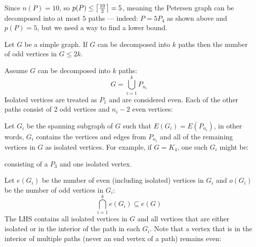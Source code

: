 \documentclass[letterpaper,12pt,fleqn]{article}
\DeclarePairedDelimiter{\ceil}{\lceil}{\rceil}
\begin{document}
\begin{example}
  Since $n(P)=10$, so $p(P)\le\ceil*{\frac{10}{2}}=5$, meaning the Petersen
  graph can be decomposed into at most $5$ paths --- indeed: $P=5P_4$ as shown
  above and $p(P)=5$, but we need a way to find a lower bound.
\end{example}

\begin{theorem}
  Let $G$ be a simple graph. If $G$ can be decomposed into $k$ paths then the
  number of odd vertices in $G\le2k$.
\end{theorem}

\begin{theproof}
  Assume $G$ can be decomposed into $k$ paths:
  \[G=\bigcup_{i=1}^kP_{n_i}\]
  Isolated vertices are treated as $P_1$ and are considered even. Each of the
  other paths consist of $2$ odd vertices and $n_i-2$ even vertices:


  Let $G_i$ be the spanning subgraph of $G$ such that $E(G_i)=E(P_{n_i})$, in
  other words, $G_i$ contains the vertices and edges from $P_{n_i}$ and all of
  the remaining vertices in $G$ as isolated vertices. For example, if $G=K_4$,
  one such $G_i$ might be:


  consisting of a $P_3$ and one isolated vertex.

  Let $e(G_i)$ be the number of even (including isolated) vertices in $G_i$ and
  $o(G_i)$ be the number of odd vertices in $G_i$:
  \[\bigcap_{i=1}^ke(G_i)\subseteq e(G)\]
  The LHS contains all isolated vertices in $G$ and all vertices that are
  either isolated or in the interior of the path in each $G_i$. Note that a
  vertex that is in the interior of multiple paths (never an end vertex of a
  path) remains even:


\end{theproof}
\end{document}
